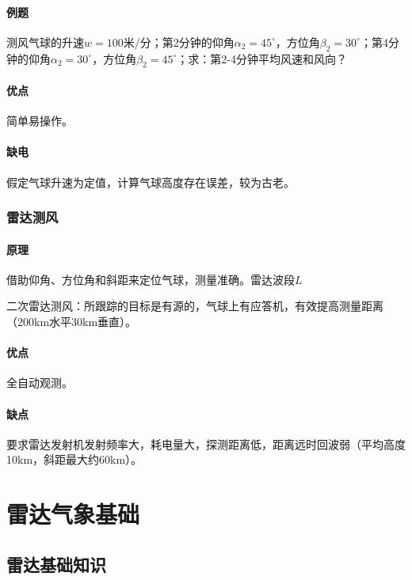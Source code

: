 \documentclass[UTF8,11pt]{ctexbook}
\begin{document}
\subsubsection{例题}

测风气球的升速\(w=100\)米/分；第2分钟的仰角\(\alpha_2=45^\circ\)，方位角\(\beta_2=30^\circ\)；第4分钟的仰角\(\alpha_2=30^\circ\)，方位角\(\beta_2=45^\circ\)；求：第2-4分钟平均风速和风向？
	   
\subsubsection{优点}

简单易操作。

\subsubsection{缺电}

假定气球升速为定值，计算气球高度存在误差，较为古老。

\subsection{雷达测风}

\subsubsection{原理}

借助仰角、方位角和斜距来定位气球，测量准确。雷达波段\(L\)

二次雷达测风：所跟踪的目标是有源的，气球上有应答机，有效提高测量距离（200km水平30km垂直）。

\subsubsection{优点}

全自动观测。

\subsubsection{缺点}

要求雷达发射机发射频率大，耗电量大，探测距离低，距离远时回波弱（平均高度10km，斜距最大约60km）。

\chapter{雷达气象基础}

\section{雷达基础知识}
\end{document}

